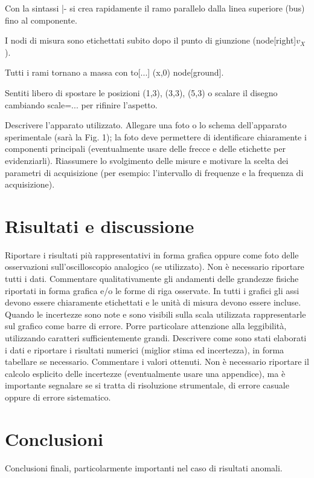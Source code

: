 \documentclass[12pt]{article}
\begin{document}
Con la sintassi |- si crea rapidamente il ramo parallelo dalla linea superiore (bus) fino al componente.

I nodi di misura sono etichettati subito dopo il punto di giunzione (node[right]{$v_X$}).

Tutti i rami tornano a massa con to[...] (x,0) node[ground]{}.


Sentiti libero di spostare le posizioni (1,3), (3,3), (5,3) o scalare il disegno cambiando scale=... per rifinire l’aspetto.



Descrivere l’apparato utilizzato. Allegare una foto o lo schema dell’apparato sperimentale
(sarà la Fig. 1); la foto deve permettere di identificare chiaramente i componenti principali
(eventualmente usare delle frecce e delle etichette per evidenziarli). Riassumere lo svolgimento
delle misure e motivare la scelta dei parametri di acquisizione (per esempio: l’intervallo di frequenze
e la frequenza di acquisizione).
\section*{Risultati e discussione}
Riportare i risultati più rappresentativi in forma grafica oppure come foto delle osservazioni
sull’oscilloscopio analogico (se utilizzato). Non è necessario riportare tutti i dati. Commentare
qualitativamente gli andamenti delle grandezze fisiche riportati in forma grafica e/o le forme di riga
osservate. In tutti i grafici gli assi devono essere chiaramente etichettati e le unità di misura devono
essere incluse. Quando le incertezze sono note e sono visibili sulla scala utilizzata rappresentarle sul
grafico come barre di errore. Porre particolare attenzione alla leggibilità, utilizzando caratteri
sufficientemente grandi.
Descrivere come sono stati elaborati i dati e riportare i risultati numerici (miglior stima ed
incertezza), in forma tabellare se necessario. Commentare i valori ottenuti. Non è necessario
riportare il calcolo esplicito delle incertezze (eventualmente usare una appendice), ma è importante
segnalare se si tratta di risoluzione strumentale, di errore casuale oppure di errore sistematico.
\section*{Conclusioni}
Conclusioni finali, particolarmente importanti nel caso di risultati anomali.
\end{document}
